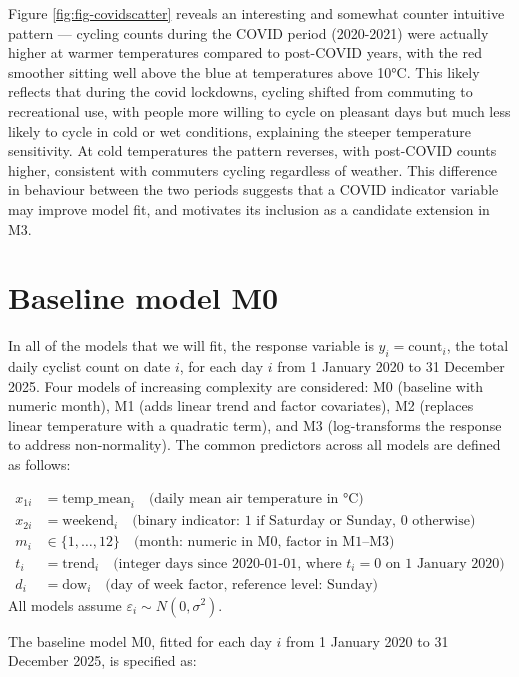 \documentclass[
]{article}
\begin{document}
Figure \ref{fig:fig-covidscatter} reveals an interesting and somewhat counter intuitive pattern --- cycling counts during the COVID period (2020-2021) were actually higher at warmer temperatures compared to post-COVID years, with the red smoother sitting well
above the blue at temperatures above 10°C. This likely reflects that during the covid lockdowns, cycling shifted from commuting to recreational use, with people more willing to cycle on pleasant days but much less likely to cycle in cold or wet
conditions, explaining the steeper temperature sensitivity. At cold temperatures the pattern reverses, with post-COVID counts higher, consistent with commuters cycling regardless of weather. This difference in behaviour between the two periods suggests that a COVID indicator variable may improve model fit, and motivates its inclusion as a candidate extension in M3.

\section{Baseline model M0}\label{baseline-model-m0}

In all of the models that we will fit, the response variable is \(y_i = \text{count}_i\), the total
daily cyclist count on date \(i\), for each day \(i\) from 1 January 2020 to 31 December
2025. Four models of increasing complexity are considered: M0 (baseline with numeric
month), M1 (adds linear trend and factor covariates), M2 (replaces linear temperature
with a quadratic term), and M3 (log-transforms the response to address non-normality).
The common predictors across all models are defined as follows:

\begin{align*}
x_{1i} &= \text{temp\_mean}_i \quad \text{(daily mean air temperature in °C)} \\
x_{2i} &= \text{weekend}_i \quad \text{(binary indicator: 1 if Saturday or Sunday, 0 otherwise)} \\
m_i &\in \{1, \ldots, 12\} \quad \text{(month: numeric in M0, factor in M1--M3)} \\
t_i &= \text{trend}_i \quad \text{(integer days since 2020-01-01, where $t_i = 0$ on 1 January 2020)} \\
d_i &= \text{dow}_i \quad \text{(day of week factor, reference level: Sunday)}
\end{align*}
All models assume \(\varepsilon_i \sim N(0, \sigma^2)\).

The baseline model M0, fitted for each day \(i\) from 1 January 2020 to
31 December 2025, is specified as:
\end{document}
